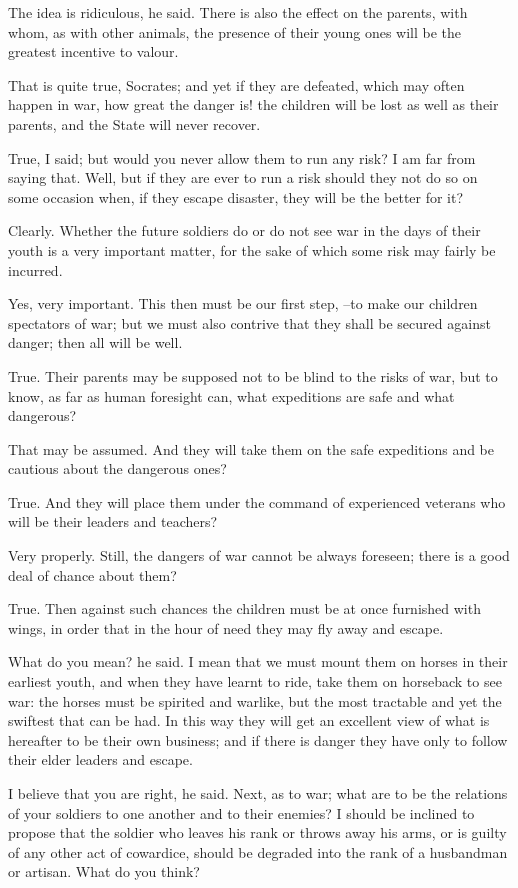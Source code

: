The idea is ridiculous, he said.
There is also the effect on the parents, with whom, as with other animals, the presence of their young ones will be the greatest incentive to valour.

That is quite true, Socrates; and yet if they are defeated, which may often happen in war, how great the danger is! the children will be lost as well as their parents, and the State will never recover.

True, I said; but would you never allow them to run any risk?
I am far from saying that.
Well, but if they are ever to run a risk should they not do so on some occasion when, if they escape disaster, they will be the better for it?

Clearly.
Whether the future soldiers do or do not see war in the days of their youth is a very important matter, for the sake of which some risk may fairly be incurred.

Yes, very important.
This then must be our first step, --to make our children spectators of war; but we must also contrive that they shall be secured against danger; then all will be well.

True.
Their parents may be supposed not to be blind to the risks of war, but to know, as far as human foresight can, what expeditions are safe and what dangerous?

That may be assumed.
And they will take them on the safe expeditions and be cautious about the dangerous ones?

True.
And they will place them under the command of experienced veterans who will be their leaders and teachers?

Very properly.
Still, the dangers of war cannot be always foreseen; there is a good deal of chance about them?

True.
Then against such chances the children must be at once furnished with wings, in order that in the hour of need they may fly away and escape.

What do you mean? he said.
I mean that we must mount them on horses in their earliest youth, and when they have learnt to ride, take them on horseback to see war: the horses must be spirited and warlike, but the most tractable and yet the swiftest that can be had. In this way they will get an excellent view of what is hereafter to be their own business; and if there is danger they have only to follow their elder leaders and escape.

I believe that you are right, he said.
Next, as to war; what are to be the relations of your soldiers to one another and to their enemies? I should be inclined to propose that the soldier who leaves his rank or throws away his arms, or is guilty of any other act of cowardice, should be degraded into the rank of a husbandman or artisan. What do you think?

